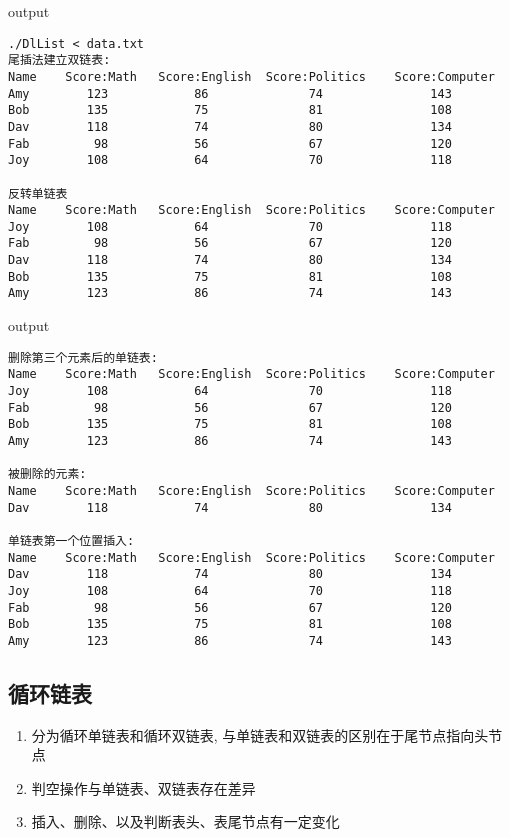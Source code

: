 \begin{macbox}{output}
    \begin{verbatim}
./DlList < data.txt
尾插法建立双链表:
Name    Score:Math   Score:English  Score:Politics    Score:Computer
Amy        123            86              74               143
Bob        135            75              81               108
Dav        118            74              80               134
Fab         98            56              67               120
Joy        108            64              70               118

反转单链表
Name    Score:Math   Score:English  Score:Politics    Score:Computer
Joy        108            64              70               118
Fab         98            56              67               120
Dav        118            74              80               134
Bob        135            75              81               108
Amy        123            86              74               143
    \end{verbatim}
\end{macbox}
\begin{macbox}{output}
    \begin{verbatim}
删除第三个元素后的单链表:
Name    Score:Math   Score:English  Score:Politics    Score:Computer
Joy        108            64              70               118
Fab         98            56              67               120
Bob        135            75              81               108
Amy        123            86              74               143

被删除的元素:
Name    Score:Math   Score:English  Score:Politics    Score:Computer
Dav        118            74              80               134

单链表第一个位置插入:
Name    Score:Math   Score:English  Score:Politics    Score:Computer
Dav        118            74              80               134
Joy        108            64              70               118
Fab         98            56              67               120
Bob        135            75              81               108
Amy        123            86              74               143
    \end{verbatim}
\end{macbox}
\subsection{循环链表}
\begin{definition}[循环链表]
    \begin{enumerate}
        \item 分为循环单链表和循环双链表, 与单链表和双链表的区别在于尾节点指向头节点
        \item 判空操作与单链表、双链表存在差异
        \item 插入、删除、以及判断表头、表尾节点有一定变化
    \end{enumerate}
\end{definition}

